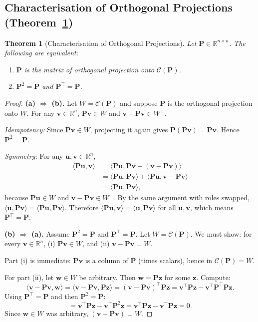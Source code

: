 \documentclass[11pt,a4paper]{article}
\theoremstyle{plain}
\newtheorem{theorem}{Theorem}[section]
\theoremstyle{definition}
\newcommand{\R}{\mathbb{R}}
\newcommand{\Col}{\mathcal{C}}
\newcommand{\ip}[2]{\langle #1, #2 \rangle}
\begin{document}
\subsection{Characterisation of Orthogonal Projections (Theorem~\ref{thm:proj-char})}

\begin{theorem}[Characterisation of Orthogonal Projections]\label{thm:proj-char}
Let $\bm{P}\in\R^{n\times n}$.  The following are equivalent:
\begin{enumerate}[nosep,label=(\alph*)]
  \item $\bm{P}$ is the matrix of orthogonal projection onto $\Col(\bm{P})$.
  \item $\bm{P}^2 = \bm{P}$ and $\bm{P}^\top = \bm{P}$.
\end{enumerate}
\end{theorem}

\begin{proof}
\textbf{(a) $\Rightarrow$ (b).}
Let $W = \Col(\bm{P})$ and suppose $\bm{P}$ is the orthogonal projection
onto $W$.  For any $\bm{v}\in\R^n$, $\bm{P}\bm{v}\in W$ and
$\bm{v} - \bm{P}\bm{v}\in W^\perp$.

\emph{Idempotency:}
Since $\bm{P}\bm{v}\in W$, projecting it again gives
$\bm{P}(\bm{P}\bm{v}) = \bm{P}\bm{v}$. Hence $\bm{P}^2 = \bm{P}$.

\emph{Symmetry:}
For any $\bm{u}, \bm{v}\in\R^n$,
\begin{align*}
  \ip{\bm{P}\bm{u}}{\bm{v}}
  &= \ip{\bm{P}\bm{u}}{\bm{P}\bm{v} + (\bm{v}-\bm{P}\bm{v})} \\
  &= \ip{\bm{P}\bm{u}}{\bm{P}\bm{v}} + \ip{\bm{P}\bm{u}}{\bm{v}-\bm{P}\bm{v}} \\
  &= \ip{\bm{P}\bm{u}}{\bm{P}\bm{v}},
\end{align*}
because $\bm{P}\bm{u}\in W$ and $\bm{v}-\bm{P}\bm{v}\in W^\perp$.
By the same argument with roles swapped,
$\ip{\bm{u}}{\bm{P}\bm{v}} = \ip{\bm{P}\bm{u}}{\bm{P}\bm{v}}$.
Therefore $\ip{\bm{P}\bm{u}}{\bm{v}} = \ip{\bm{u}}{\bm{P}\bm{v}}$ for all
$\bm{u},\bm{v}$, which means $\bm{P}^\top = \bm{P}$.

\medskip
\noindent\textbf{(b) $\Rightarrow$ (a).}
Assume $\bm{P}^2 = \bm{P}$ and $\bm{P}^\top = \bm{P}$.
Let $W = \Col(\bm{P})$.
We must show: for every $\bm{v}\in\R^n$,
(i) $\bm{P}\bm{v}\in W$, and
(ii) $\bm{v} - \bm{P}\bm{v} \perp W$.

Part (i) is immediate: $\bm{P}\bm{v}$ is a column of $\bm{P}$ (times scalars),
hence in $\Col(\bm{P}) = W$.

For part (ii), let $\bm{w}\in W$ be arbitrary. Then $\bm{w} = \bm{P}\bm{z}$
for some $\bm{z}$.  Compute:
\[
  \ip{\bm{v} - \bm{P}\bm{v}}{\bm{w}}
  = \ip{\bm{v} - \bm{P}\bm{v}}{\bm{P}\bm{z}}
  = (\bm{v} - \bm{P}\bm{v})^\top\bm{P}\bm{z}
  = \bm{v}^\top\bm{P}\bm{z} - \bm{v}^\top\bm{P}^\top\bm{P}\bm{z}.
\]
Using $\bm{P}^\top = \bm{P}$ and then $\bm{P}^2 = \bm{P}$:
\[
  = \bm{v}^\top\bm{P}\bm{z} - \bm{v}^\top\bm{P}^2\bm{z}
  = \bm{v}^\top\bm{P}\bm{z} - \bm{v}^\top\bm{P}\bm{z}
  = 0.
\]
Since $\bm{w}\in W$ was arbitrary, $(\bm{v}-\bm{P}\bm{v})\perp W$.
\end{proof}
\end{document}
